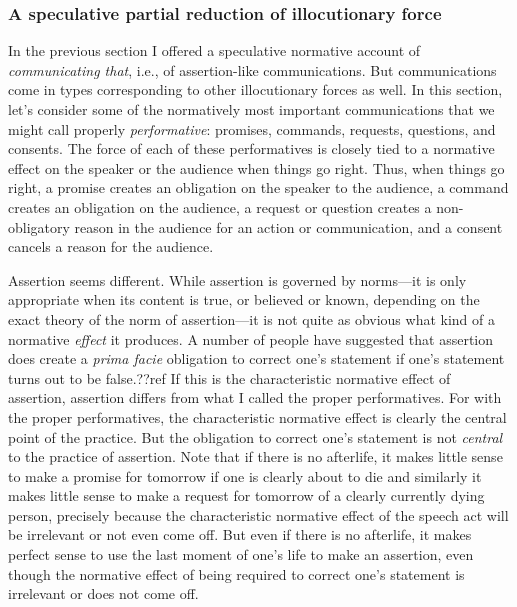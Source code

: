 \subsubsection{A speculative partial reduction of illocutionary force}
In the previous section I offered a speculative normative account of \textit{communicating that}, i.e., of assertion-like 
communications. But communications come in types corresponding to other illocutionary forces as well. In this section, 
let's consider some of the normatively most important communications that we might call properly \textit{performative}: promises, 
commands, requests, questions, and consents. The force of each of these performatives is closely tied to a normative effect on the speaker or the audience when things go right. Thus, when things go right, a promise creates 
an obligation on the speaker to the audience, a command creates an obligation on the audience, a request or
question creates a non-obligatory reason in the audience for an action or communication, and a consent cancels a reason 
for the audience. 

Assertion seems different. While assertion is governed by norms---it is only appropriate when its content
is true, or believed or known, depending on the exact theory of the norm of assertion---it is not quite as obvious
what kind of a normative \textit{effect} it produces. A number of people have suggested that assertion does create
a \textit{prima facie} obligation to correct one's statement if one's statement turns out to be false.??ref If this is the
characteristic normative effect of assertion, assertion differs from what I called the proper performatives. For with the 
proper performatives, the characteristic normative effect is clearly the central point of the practice. But the 
obligation to correct one's statement is not \textit{central} to the practice of assertion. Note that
if there is no afterlife, it makes little sense to make a promise for tomorrow if one is clearly about to die and 
similarly it makes little sense to make a request for tomorrow of a clearly currently dying person, precisely because
the characteristic normative effect of the speech act will be irrelevant or not even come off. But even if there is 
no afterlife, it makes perfect sense to use the last moment of one's life to make an assertion, even though the
normative effect of being required to correct one's statement is irrelevant or does not come off. 

